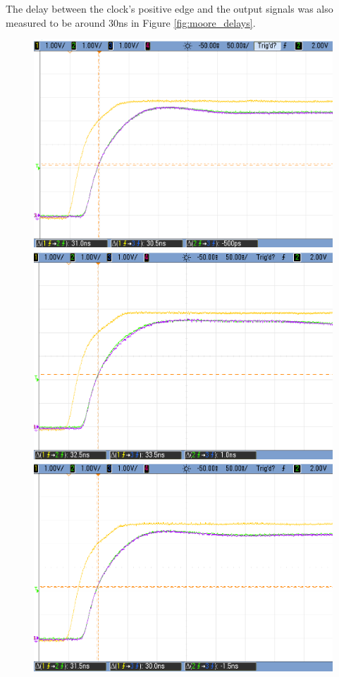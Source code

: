 The delay between the clock's positive edge and the output signals was also measured to be around 30ns in Figure \ref{fig:moore_delays}.

\begin{figure}[H]
    \begin{center}
        \includegraphics[scale=0.3]{../Exercise1/Moore/report/images/e3e1_1.png}\\
        \includegraphics[scale=0.3]{../Exercise1/Moore/report/images/e3e1_1k.png}\\
        \includegraphics[scale=0.3]{../Exercise1/Moore/report/images/e3e1_100k_.png}

\end{center}
\end{figure}
